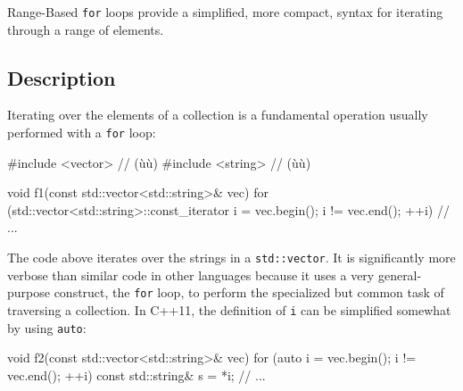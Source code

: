 

\label{range-based-for-loops}
\setcounter{table}{0}
\setcounter{footnote}{0}
\setcounter{lstlisting}{0}

Range-Based \lstinline!for! loops provide a simplified, more compact,
syntax for iterating through a range of elements.

\subsection[Description]{Description}\label{description-rangefor}

Iterating over the elements of a collection is a fundamental operation
usually performed with a \lstinline!for! loop:

\begin{emcppslisting}[emcppsbatch=e1]
#include <vector>  // (ù{}ù)
#include <string>  // (ù{}ù)

void f1(const std::vector<std::string>& vec)
{
    for (std::vector<std::string>::const_iterator i = vec.begin();
         i != vec.end(); ++i)
    {
        // ...
    }
}
\end{emcppslisting}
    

\noindent The code above iterates over the strings in a \lstinline!std::vector!. It
is significantly more verbose than similar code in other languages
because it uses a very general-purpose construct, the \lstinline!for! loop,
to perform the specialized but common task of traversing a collection.
In C++11, the definition of \lstinline!i! can be simplified somewhat by
using \lstinline!auto!:

\begin{emcppslisting}[emcppsbatch=e1]
void f2(const std::vector<std::string>& vec)
{
    for (auto i = vec.begin(); i != vec.end(); ++i)
    {
        const std::string& s = *i;
        // ...
    }
}
\end{emcppslisting}
    

